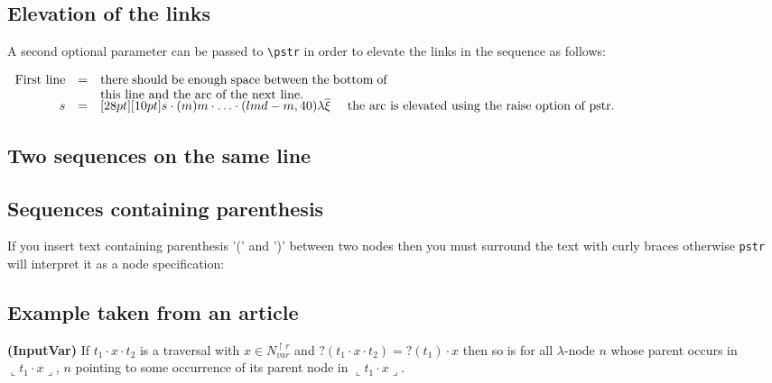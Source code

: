 \subsection{Elevation of the links}
A second optional parameter can be passed to \verb|\pstr| in order to elevate the links in the sequence as follows:
\begin{codeexample}[width=5cm]
$\begin{array}{rclrcl}
\mbox{First line} &=& \parbox[t]{8cm}{there should be enough space between the
                        bottom of this line and the arc of the next line.} \\
                s &=& \Pstr[28pt][10pt]{ s \cdot (m){m} \cdot \ldots \cdot (lmd-m,40)
                         {\lambda\overline{\xi}} }
    \quad \mbox{ the arc is elevated using the raise option of pstr.}
\end{array}$
\end{codeexample}

\subsection{Two sequences on the same line}
\begin{codeexample}[width=7cm]
\qquad
{}
\end{codeexample}

\subsection{Sequences containing parenthesis}
If you insert text containing parenthesis '(' and ')' between two nodes then you must surround
the text with curly braces otherwise \verb|pstr| will interpret it as a node specification:
\begin{codeexample}[width=7.1cm]
\end{codeexample}

\subsection{Example taken from an article}
\newcommand{\oview}[1]{\llcorner #1 \lrcorner}
{\bf (InputVar)} If $t_1 \cdot x \cdot t_2$ is a traversal with
  $x \in N_{var}^{\upharpoonright r}$ and $?(t_1 \cdot x \cdot
  t_2)=?(t_1) \cdot x$ then so is  for all
  $\lambda$-node $n$ whose parent occurs in $\oview{t_1 \cdot x}$, $n$
  pointing to some occurrence of its parent node in $\oview{t_1 \cdot x}$.

